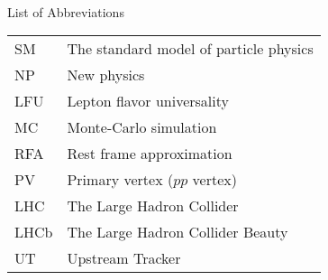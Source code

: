 \singlespacing \normalsize
\hbox{\ }

\vspace{.5in}

\begin{center}
\large{List of Abbreviations}
\end{center}

\vspace{3pt}

\begin{supertabular}{ll}
    SM    & The standard model of particle physics \\
    NP    & New physics \\
    LFU   & Lepton flavor universality \\
    MC    & Monte-Carlo simulation \\
    RFA   & Rest frame approximation \\
    PV    & Primary vertex ($pp$ vertex) \\
    LHC   & The Large Hadron Collider \\
    LHCb  & The Large Hadron Collider Beauty \\
    UT    & Upstream Tracker \\
\end{supertabular}
